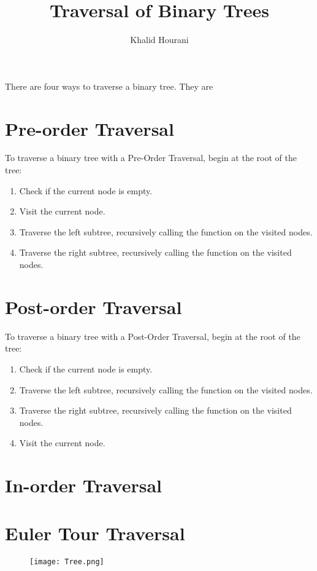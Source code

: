 \documentclass[a4paper]{article}
\title{Traversal of Binary Trees}
\author{Khalid Hourani}
\begin{document}
There are four ways to traverse a binary tree. They are


\section{Pre-order Traversal}
To traverse a binary tree with a Pre-Order Traversal, begin at the root of the tree:
\begin{enumerate}
	\item Check if the current node is empty. 
	\item Visit the current node.
	\item Traverse the left subtree, recursively calling the function on the visited nodes.
	\item Traverse the right subtree, recursively calling the function on the visited nodes.
\end{enumerate}
\section{Post-order Traversal}
To traverse a binary tree with a Post-Order Traversal, begin at the root of the tree:
\begin{enumerate}
	\item Check if the current node is empty. 
	\item Traverse the left subtree, recursively calling the function on the visited nodes.
	\item Traverse the right subtree, recursively calling the function on the visited nodes.
	\item Visit the current node. 
\end{enumerate}
\section{In-order Traversal}
\section{Euler Tour Traversal}

\begin{figure}[h]
 \texttt{[image: Tree.png]}
\end{figure}
\end{document}
